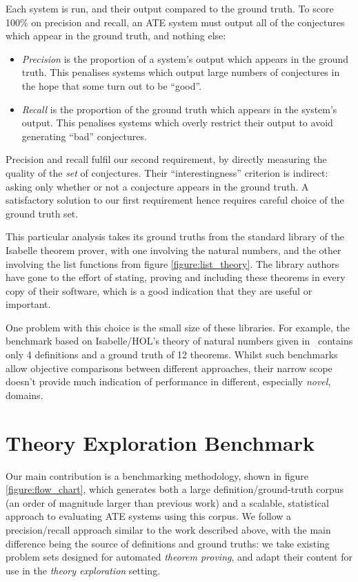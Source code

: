 Each system is run, and their output compared to the ground truth. To score
100\% on precision and recall, an ATE system must output all of the conjectures
which appear in the ground truth, and nothing else:

\begin{itemize}
\item \emph{Precision} is the proportion of a system's output which appears in
  the ground truth. This penalises systems which output large numbers of
  conjectures in the hope that some turn out to be ``good''.
\item \emph{Recall} is the proportion of the ground truth which appears in the
  system's output. This penalises systems which overly restrict their output to
  avoid generating ``bad'' conjectures.
\end{itemize}

Precision and recall fulfil our second requirement, by directly measuring the
quality of the \emph{set} of conjectures. Their ``interestingness'' criterion is
indirect: asking only whether or not a conjecture appears in the ground truth.
A satisfactory solution to our first requirement hence requires careful choice
of the ground truth set.

This particular analysis takes its ground truths from the standard library of
the Isabelle theorem prover, with one involving the natural numbers, and the
other involving the list functions from figure \ref{figure:list_theory}. The library authors have gone to the effort of stating,
proving and including these theorems in every copy of their software, which is a
good indication that they are useful or important.

One problem with this choice is the small size of these libraries. For example,
the benchmark based on Isabelle/HOL's theory of natural numbers given
in~\cite{Johansson.Dixon.Bundy:conjecture-generation} contains only 4
definitions and a ground truth of 12 theorems. Whilst such benchmarks allow
objective comparisons between different approaches, their narrow scope doesn't
provide much indication of performance in different, especially \emph{novel},
domains.

\section{Theory Exploration Benchmark}
\label{sec:proposal}

Our main contribution is a benchmarking methodology, shown in figure
\ref{figure:flow_chart}, which generates both a large definition/ground-truth
corpus (an order of magnitude larger than previous work) and a scalable,
statistical approach to evaluating ATE systems using this corpus. We follow a
precision/recall approach similar to the work described above, with the main
difference being the source of definitions and ground truths: we take existing
problem sets designed for automated \emph{theorem proving}, and adapt their
content for use in the \emph{theory exploration} setting.

